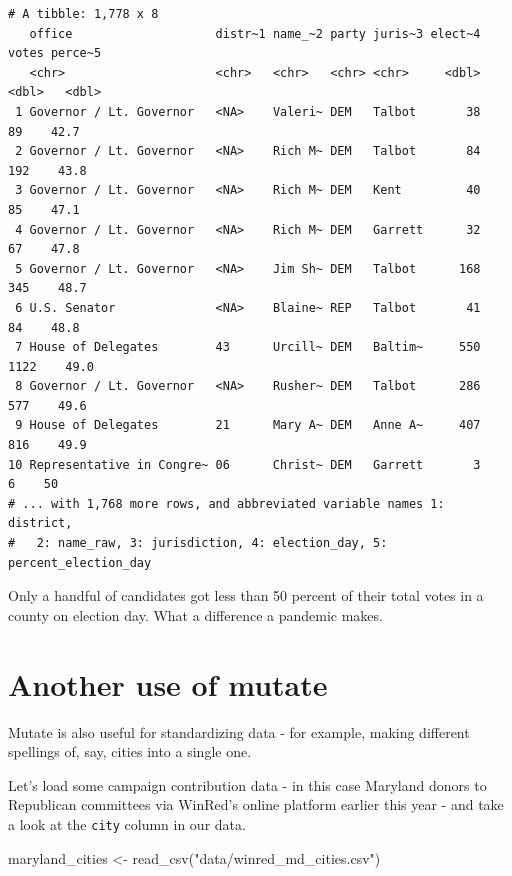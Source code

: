 \documentclass[
  letterpaper,
  DIV=11,
  numbers=noendperiod]{scrreprt}
\newenvironment{Shaded}{\begin{snugshade}}{\end{snugshade}}
\newcommand{\FunctionTok}[1]{\textcolor[rgb]{0.28,0.35,0.67}{#1}}
\newcommand{\NormalTok}[1]{\textcolor[rgb]{0.00,0.23,0.31}{#1}}
\newcommand{\OtherTok}[1]{\textcolor[rgb]{0.00,0.23,0.31}{#1}}
\newcommand{\StringTok}[1]{\textcolor[rgb]{0.13,0.47,0.30}{#1}}
\begin{document}
\begin{verbatim}
# A tibble: 1,778 x 8
   office                    distr~1 name_~2 party juris~3 elect~4 votes perce~5
   <chr>                     <chr>   <chr>   <chr> <chr>     <dbl> <dbl>   <dbl>
 1 Governor / Lt. Governor   <NA>    Valeri~ DEM   Talbot       38    89    42.7
 2 Governor / Lt. Governor   <NA>    Rich M~ DEM   Talbot       84   192    43.8
 3 Governor / Lt. Governor   <NA>    Rich M~ DEM   Kent         40    85    47.1
 4 Governor / Lt. Governor   <NA>    Rich M~ DEM   Garrett      32    67    47.8
 5 Governor / Lt. Governor   <NA>    Jim Sh~ DEM   Talbot      168   345    48.7
 6 U.S. Senator              <NA>    Blaine~ REP   Talbot       41    84    48.8
 7 House of Delegates        43      Urcill~ DEM   Baltim~     550  1122    49.0
 8 Governor / Lt. Governor   <NA>    Rusher~ DEM   Talbot      286   577    49.6
 9 House of Delegates        21      Mary A~ DEM   Anne A~     407   816    49.9
10 Representative in Congre~ 06      Christ~ DEM   Garrett       3     6    50  
# ... with 1,768 more rows, and abbreviated variable names 1: district,
#   2: name_raw, 3: jurisdiction, 4: election_day, 5: percent_election_day
\end{verbatim}

Only a handful of candidates got less than 50 percent of their total
votes in a county on election day. What a difference a pandemic makes.

\hypertarget{another-use-of-mutate}{%
\section{Another use of mutate}\label{another-use-of-mutate}}

Mutate is also useful for standardizing data - for example, making
different spellings of, say, cities into a single one.

Let's load some campaign contribution data - in this case Maryland
donors to Republican committees via WinRed's online platform earlier
this year - and take a look at the \texttt{city} column in our data.

\begin{Shaded}
\begin{Highlighting}[]
\NormalTok{maryland\_cities }\OtherTok{\textless{}{-}} \FunctionTok{read\_csv}\NormalTok{(}\StringTok{"data/winred\_md\_cities.csv"}\NormalTok{)}
\end{Highlighting}
\end{Shaded}
\end{document}
